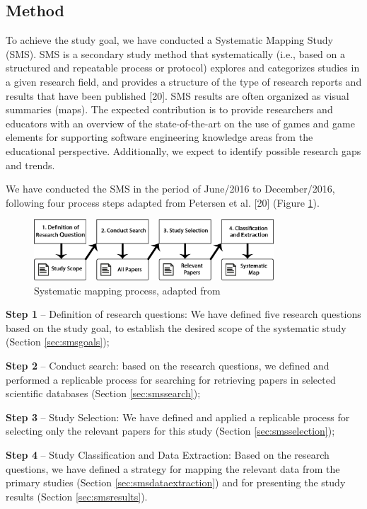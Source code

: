 \subsection{Method}
\label{sec:smsmethod}

To achieve the study goal, we have conducted a Systematic Mapping Study (SMS). SMS is a secondary study method that systematically (i.e., based on a structured and repeatable process or protocol) explores and categorizes studies in a given research field, and provides a structure of the type of research reports and results that have been published \citep{Petersen:2007}[20]. SMS results are often organized as visual summaries (maps). The expected contribution is to provide researchers and educators with an overview of the state-of-the-art on the use of games and game elements for supporting software engineering knowledge areas from the educational perspective. Additionally, we expect to identify possible research gaps and trends.

We have conducted the SMS in the period of June/2016 to December/2016, following four process steps adapted from Petersen et al. \citep{Petersen:2007}[20] (Figure \ref{fig:smsprocess}).

\begin{figure}[!h]%
\centering
\includegraphics[width=0.8\textwidth]{img/smsprocess.png}
\caption{Systematic mapping process, adapted from \cite{Petersen:2007}}
\label{fig:smsprocess}
\end{figure} 

\textbf{Step 1} – Definition of research questions: We have defined five research questions based on the study goal, to establish the desired scope of the systematic study (Section \ref{sec:smsgoals});

\textbf{Step 2} – Conduct search: based on the research questions, we defined and performed a replicable process for searching for retrieving papers in selected scientific databases (Section \ref{sec:smssearch});

\textbf{Step 3} – Study Selection: We have defined and applied a replicable process for selecting only the relevant papers for this study (Section \ref{sec:smsselection});

\textbf{Step 4} – Study Classification and Data Extraction: Based on the research questions, we have defined a strategy for mapping the relevant data from the primary studies (Section \ref{sec:smsdataextraction}) and for presenting the study results (Section \ref{sec:smsresults}). 

